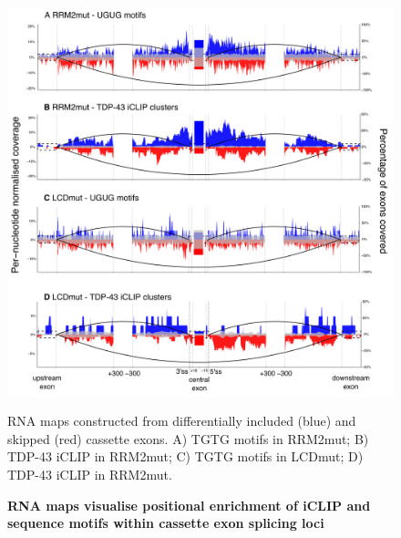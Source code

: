 \begin{figure}[h]
	\centering
	\includegraphics[width=14cm]{Figures/05_tdp_mice/RNAmap_cassettes.png}
	\caption{\textbf{RNA maps visualise positional enrichment of iCLIP and sequence motifs within cassette exon splicing loci}}
	RNA maps constructed from differentially included (blue) and skipped (red) cassette exons.  A) TGTG motifs in RRM2mut; B) TDP-43 iCLIP in RRM2mut; C) TGTG motifs in LCDmut; D) TDP-43 iCLIP in RRM2mut.
	
	\label{fig:RNAmap_cassettes}
\end{figure}

